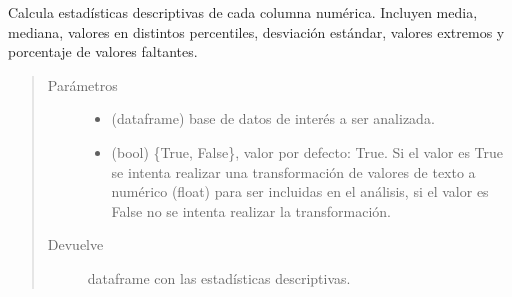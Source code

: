\documentclass[letterpaper,10pt,openany,spanish]{sphinxmanual}
\begin{document}
\begin{fulllineitems}
\label{\detokenize{datos:datos.descriptivas}}
Calcula estadísticas descriptivas de cada columna numérica. Incluyen media, mediana, valores en distintos percentiles, desviación estándar, valores extremos y porcentaje de valores faltantes.
\begin{quote}\begin{description}
\item[{Parámetros}] \leavevmode\begin{itemize}
\item {} 
 \textendash{} (dataframe) base de datos de interés a ser analizada.

\item {} 
 \textendash{} (bool) \{True, False\}, valor por defecto: True. Si el valor es True se intenta realizar una transformación de valores de texto a numérico (float) para ser incluidas en el análisis, si el valor es False no se intenta realizar la transformación.

\end{itemize}

\item[{Devuelve}] \leavevmode
dataframe con las estadísticas descriptivas.

\end{description}\end{quote}

\end{fulllineitems}

\end{document}
